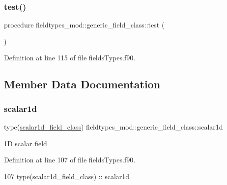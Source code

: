 \subsubsection{\texorpdfstring{test()}{test()}}
{\footnotesize\ttfamily procedure fieldtypes\+\_\+mod\+::generic\+\_\+field\+\_\+class\+::test (\begin{DoxyParamCaption}{ }\end{DoxyParamCaption})\hspace{0.3cm}{\ttfamily [private]}}



Definition at line 115 of file fields\+Types.\+f90.



\subsection{Member Data Documentation}
\mbox{\label{structfieldtypes__mod_1_1generic__field__class_ab28f23e646f7cfe4a42d6dc47a896bf9}} 
\subsubsection{\texorpdfstring{scalar1d}{scalar1d}}
{\footnotesize\ttfamily type(\mbox{\hyperlink{structfieldtypes__mod_1_1scalar1d__field__class}{scalar1d\+\_\+field\+\_\+class}}) fieldtypes\+\_\+mod\+::generic\+\_\+field\+\_\+class\+::scalar1d\hspace{0.3cm}{\ttfamily [private]}}



1D scalar field 



Definition at line 107 of file fields\+Types.\+f90.


\begin{DoxyCode}
107         \textcolor{keywordtype}{type}(scalar1d\_field\_class) :: scalar1d
\end{DoxyCode}
\mbox{\label{structfieldtypes__mod_1_1generic__field__class_ad4d960a63ab944d31c3a5c7538418d59}} 
